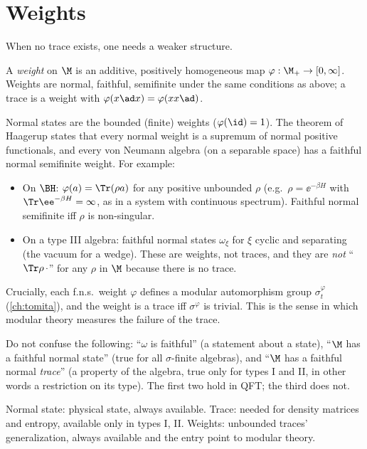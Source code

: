 \section{Weights}

When no trace exists, one needs a weaker structure.

\begin{definition}
A \emph{weight} on $\M$ is an additive, positively homogeneous map $\varphi:\M_+\to[0,\infty]$. Weights are normal, faithful, semifinite under the same conditions as above; a trace is a weight with $\varphi(x\ad x)=\varphi(xx\ad)$.
\end{definition}
Normal states are the bounded (finite) weights ($\varphi(\id)=1$). The theorem of Haagerup states that every normal weight is a supremum of normal positive functionals, and every von Neumann algebra (on a separable space) has a faithful normal semifinite weight. For example:
\begin{itemize}
\item On $\BH$: $\varphi(a)=\Tr(\rho a)$ for any positive unbounded $\rho$ (e.g.\ $\rho=\ee^{-\beta H}$ with $\Tr\ee^{-\beta H}=\infty$, as in a system with continuous spectrum). Faithful normal semifinite iff $\rho$ is non-singular.
\item On a type III algebra: faithful normal states $\omega_\xi$ for $\xi$ cyclic and separating (the vacuum for a wedge). These are weights, not traces, and they are \emph{not} ``$\Tr\rho\,\cdot$'' for any $\rho$ in $\M$ because there is no trace.
\end{itemize}
Crucially, each f.n.s.\ weight $\varphi$ defines a modular automorphism group $\sigma_t^\varphi$ (\cref{ch:tomita}), and the weight is a trace iff $\sigma^\varphi$ is trivial. This is the sense in which modular theory measures the failure of the trace.

\begin{whatwrong}
Do not confuse the following: ``$\omega$ is faithful'' (a statement about a state), ``$\M$ has a faithful normal state'' (true for all $\sigma$-finite algebras), and ``$\M$ has a faithful normal \emph{trace}'' (a property of the algebra, true only for types I and II, in other words a restriction on its type). The first two hold in QFT; the third does not.
\end{whatwrong}

\begin{keyidea}
Normal state: physical state, always available. Trace: needed for density matrices and entropy, available only in types I, II. Weights: unbounded traces' generalization, always available and the entry point to modular theory.
\end{keyidea}


